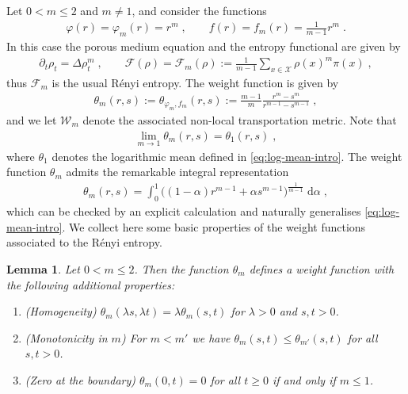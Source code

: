 \documentclass[a4paper,11pt,reqno]{amsart}
\theoremstyle{plain}
\newtheorem{lemma}[theorem]{Lemma}
\theoremstyle{remark}
\numberwithin{equation}{section}
\begin{document}
Let $0 < m \leq 2$ and $m \neq 1$, and consider the functions
\begin{align*}
 {\varphi}(r) = {\varphi}_m(r) = r^m\;,\qquad  f(r) = f_m(r) = \frac{1}{m-1} r^m\;.
\end{align*}
In this case the porous medium equation and the entropy functional are given by
\begin{align*}
\partial_t \rho_t = \Delta \rho_t^m\;,\qquad
 {\mathcal{F}}(\rho) =  {\mathcal{F}}_m(\rho) := \frac{1}{m-1}\sum_{x \in {\mathcal{X}}} \rho(x)^m \pi(x)\;,
\end{align*}
thus ${\mathcal{F}}_m$ is the usual R\'enyi entropy. The weight function is given by
\begin{align}\label{eq:thetam}
 \theta_m(r,s) := \theta_{{\varphi}_m,f_m}(r,s) 
			  := \frac{m-1}{m}\frac{r^m - s^m}{r^{m-1} - s^{m-1}}\;,
\end{align}
and we let ${\mathcal{W}}_m$ denote the associated non-local transportation metric. 
Note that 
\begin{align*}
 \lim_{m \to 1} \theta_m(r,s)  = \theta_1(r,s)\;,
\end{align*}
where $\theta_1$ denotes the logarithmic mean defined in
\eqref{eq:log-mean-intro}. The weight function $\theta_m$ admits the remarkable integral representation
\begin{align}\label{eq:integral-rep}
 \theta_m(r,s)= 
   \int_0^1 \Big( (1-\alpha) r^{m-1} + \alpha s^{m-1} \Big)^{\frac{1}{m-1}} {\; \mathrm{d}} \alpha\;,
\end{align}
which can be checked by an explicit calculation and naturally generalises \eqref{eq:log-mean-intro}.
We collect here some basic properties of the weight functions
associated to the R\'enyi entropy.

\begin{lemma}\label{lem:theta-m}
 Let $0 < m \leq 2$. Then the function $\theta_m$ defines a 
  weight function with the following additional properties:
 \begin{enumerate}
 \item (Homogeneity) $\theta_m(\lambda s,\lambda t)=\lambda
   \theta_m(s,t)$ for $\lambda>0$ and $s,t>0$.
 \item (Monotonicity in $m$) For $m<m'$ we have $\theta_m(s,t) \leq
   \theta_{m'}(s,t)$ for all $s,t>0$.
 \item (Zero at the boundary) $\theta_m(0,t)=0$ for all
   $t\geq0$ if and only if $m\leq 1$.
 \end{enumerate}
\end{lemma}
\end{document}
